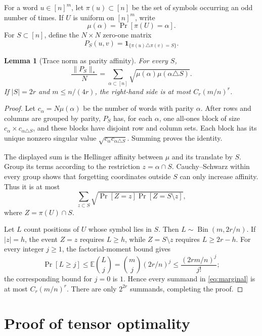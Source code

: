 \documentclass[11pt]{article}
\newtheorem{lemma}[theorem]{Lemma}
\newcommand{\E}{\mathbb E}
\begin{document}
For a word $u\in[n]^m$, let $\pi(u)\subset[n]$ be the set of symbols occurring
an odd number of times.  If $U$ is uniform on $[n]^m$, write
\[
 \mu(\alpha)=\Pr[\pi(U)=\alpha].
\]
For $S\subset[n]$, define the $N\times N$ zero-one matrix
\[
 P_S(u,v)=\mathbf 1_{\{\pi(u)\triangle\pi(v)=S\}}.
\]

\begin{lemma}[Trace norm as parity affinity]
\label{lem:trace}
For every $S$,
\[
 \frac{\|P_S\|_*}{N}
 =\sum_{\alpha\subset[n]}
   \sqrt{\mu(\alpha)\mu(\alpha\triangle S)}.
\]
If $|S|=2r$ and $m\leq n/(4r)$, the right-hand side is at most
$C_r(m/n)^r$.
\end{lemma}

\begin{proof}
Let $c_\alpha=N\mu(\alpha)$ be the number of words with parity $\alpha$.
After rows and columns are grouped by parity, $P_S$ has, for each $\alpha$,
one all-ones block of size $c_\alpha\times c_{\alpha\triangle S}$, and these
blocks have disjoint row and column sets.  Each block has its unique nonzero
singular value $\sqrt{c_\alpha c_{\alpha\triangle S}}$.  Summing proves the
identity.

The displayed sum is the Hellinger affinity between $\mu$ and its translate by
$S$.  Group its terms according to the restriction
$z=\alpha\cap S$.  Cauchy--Schwarz within every group shows that forgetting
coordinates outside $S$ can only increase affinity.  Thus it is at most
\begin{equation}
\label{eq:marginal}
 \sum_{z\subset S}\sqrt{\Pr[Z=z]\Pr[Z=S\setminus z]},
\end{equation}
where $Z=\pi(U)\cap S$.

Let $L$ count positions of $U$ whose symbol lies in $S$.  Then
$L\sim\operatorname{Bin}(m,2r/n)$.  If $|z|=h$, the event $Z=z$ requires
$L\geq h$, while $Z=S\setminus z$ requires $L\geq2r-h$.  For every integer
$j\geq1$, the factorial-moment bound gives
\[
 \Pr[L\geq j]
 \leq\E\binom Lj
 =\binom mj(2r/n)^j
 \leq\frac{(2rm/n)^j}{j!};
\]
the corresponding bound for $j=0$ is $1$.  Hence every summand in
\eqref{eq:marginal} is at most $C_r(m/n)^r$.  There are only $2^{2r}$
summands, completing the proof.
\end{proof}

\section{Proof of tensor optimality}
\end{document}
